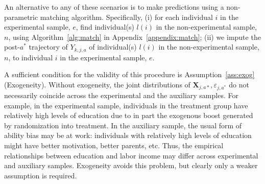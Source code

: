 An alternative to any of these scenarios is to make predictions using a non-parametric matching algorithm. Specifically, (i) for each individual $i$ in the experimental sample, $e$, find individual(s) $l(i)$ in the non-experimental sample, $n$, using Algorithm~\ref{alg:match} in Appendix~\ref{appendix:match}; (ii) we impute the post-$a^*$ trajectory of $Y_{k,j,a}$ of individual(s) $l(i)$ in the non-experimental sample, $n$, to individual $i$ in the experimental sample, $e$.

A sufficient condition for the validity of this procedure is Assumption~\ref{ass:exog} (Exogeneity). Without exogeneity, the joint distributions of $\bm{X}_{j,a*}, \varepsilon_{j,a^*}$ do not necessarily coincide across the experimental and the auxiliary samples. For example, in the experimental sample, individuals in the treatment group have relatively high levels of education due to in part the exogenous boost generated by randomization into treatment. In the auxiliary sample, the usual form of ability bias may be at work: individuals with relatively high levels of education might have better motivation, better parents, etc. Thus, the empirical relationships between education and labor income may differ across experimental and auxiliary samples. Exogeneity avoids this problem, but clearly only a weaker assumption is required.

\begin{table}
\end{table}

